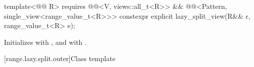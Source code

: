 %
\begin{itemdecl}
template<@@ R>
  requires @@<V, views::all_t<R>> &&
           @@<Pattern, single_view<range_value_t<R>>>
constexpr explicit lazy_split_view(R&& r, range_value_t<R> e);
\end{itemdecl}

\begin{itemdescr}
\pnum
\effects
Initializes  with , and
 with .
\end{itemdescr}

[range.lazy.split.outer]{Class template }


